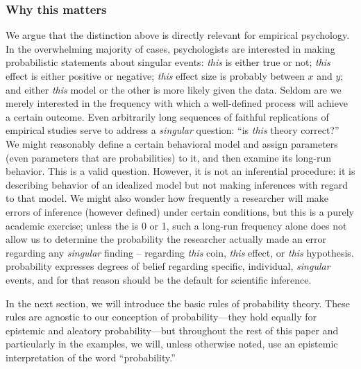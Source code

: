 \subsubsection{Why this matters} We argue that the distinction above is directly relevant for empirical psychology.  In the overwhelming majority of cases, psychologists are interested in making probabilistic statements about singular events: \emph{this}  is either true or not; \textit{this} effect is either positive or negative; \textit{this} effect size is probably between $x$ and $y$; and either \textit{this} model or the other is more likely given the data. Seldom are we merely interested in the frequency with which a well-defined process will achieve a certain outcome. {Even arbitrarily long sequences of faithful replications of empirical studies serve to address a \emph{singular} question: ``is \emph{this} theory correct?''} We might reasonably define a certain behavioral model and assign parameters {(even parameters that are probabilities)} to it, and then examine its long-run behavior.  This is a valid  question.  However, it is not an inferential procedure: it is describing behavior of an idealized model but not making inferences with regard to that model.  We might also wonder how frequently a researcher will make errors of inference (however defined) under certain conditions, but this is a purely academic exercise; unless the  is 0 or 1, such a {long-run} frequency alone does not allow us to determine the probability the researcher actually made an error regarding any \emph{singular} finding -- regarding \textit{this} coin, \textit{this} effect, or \textit{this} hypothesis.  probability expresses degrees of belief regarding specific, individual{, \emph{singular}} events, and for that reason should be the default for scientific inference.

{In the next section, we will introduce the basic rules of probability theory. These rules are agnostic to our conception of probability---they hold equally for epistemic and aleatory probability---but throughout the rest of this paper and particularly in the examples, we will, unless otherwise noted, use an epistemic interpretation of the word ``probability.''}

